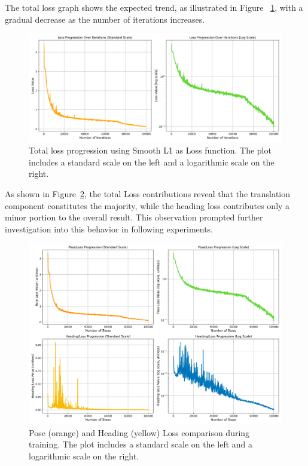 The total loss graph shows the expected trend, as illustrated in Figure ~\ref{fig:smooth-l1-total-loss}, with a gradual decrease as the number of iterations increases.
\begin{figure}[H]
    \centering
    \includegraphics[width=0.95\linewidth]{LateX//figs/loss_total_l1s_progression_comparison.png}
    \caption{Total loss progression using Smooth L1 as Loss function. The plot includes a standard scale on the left and a logarithmic scale on the right.}
    \label{fig:smooth-l1-total-loss}
\end{figure}

As shown in Figure~\ref{fig:smooth-l1-pose-heading-loss}, the total Loss contributions reveal that the translation component constitutes the majority, while the heading loss contributes only a minor portion to the overall result. This observation prompted further investigation into this behavior in following experiments.
\begin{figure}[H]
    \centering
    \includegraphics[width=0.95\linewidth]{LateX//figs/l1s_pose_heading_loss_comparison.png}
    \caption{Pose (orange) and Heading (yellow) Loss comparison during training. The plot includes a standard scale on the left and a logarithmic scale on the right.}
    \label{fig:smooth-l1-pose-heading-loss}
\end{figure}

